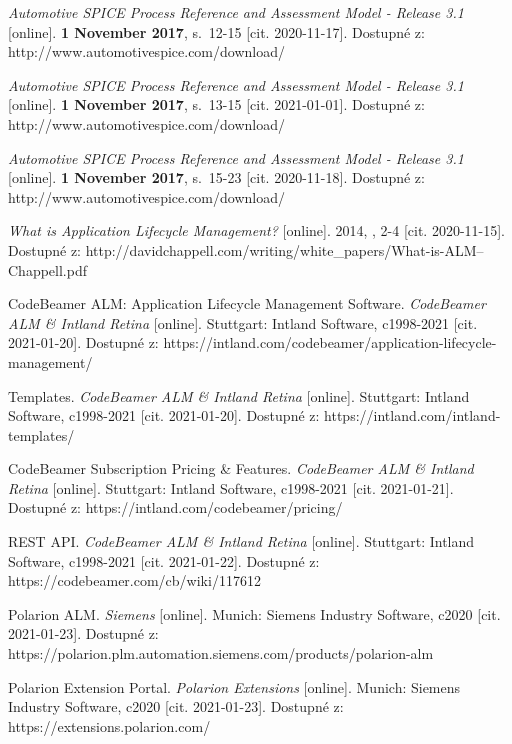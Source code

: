 \documentclass[czech,master,public,dept460,male,cpdeclaration,oneside]{diploma}
\begin{document}
\begin{thebibliography}{41}
\textit{Automotive SPICE Process Reference and Assessment Model - Release 3.1} [online]. \textbf{1 November 2017}, s.~12-15 [cit. 2020-11-17]. Dostupné z: http://www.automotivespice.com/download/


\textit{Automotive SPICE Process Reference and Assessment Model - Release 3.1} [online]. \textbf{1 November 2017}, s.~13-15 [cit. 2021-01-01]. Dostupné z: http://www.automotivespice.com/download/

\textit{Automotive SPICE Process Reference and Assessment Model - Release 3.1} [online]. \textbf{1 November 2017}, s.~15-23 [cit. 2020-11-18]. Dostupné z: http://www.automotivespice.com/download/

\textit{What is Application Lifecycle Management?} [online]. 2014, , 2-4 [cit. 2020-11-15]. Dostupné z: http://davidchappell.com/writing/white\_papers/What-is-ALM--Chappell.pdf

CodeBeamer ALM: Application Lifecycle Management Software. \textit{CodeBeamer ALM \& Intland Retina }[online]. Stuttgart: Intland Software, c1998-2021 [cit. 2021-01-20]. Dostupné z: https://intland.com/codebeamer/application-lifecycle-management/

Templates. \textit{CodeBeamer ALM \& Intland Retina} [online]. Stuttgart: Intland Software, c1998-2021 [cit. 2021-01-20]. Dostupné z: https://intland.com/intland-templates/

CodeBeamer Subscription Pricing \& Features. \textit{CodeBeamer ALM \& Intland Retina} [online]. Stuttgart: Intland Software, c1998-2021 [cit. 2021-01-21]. Dostupné z: https://intland.com/codebeamer/pricing/

REST API. \textit{CodeBeamer ALM \& Intland Retina} [online]. Stuttgart: Intland Software, c1998-2021 [cit. 2021-01-22]. Dostupné z: https://codebeamer.com/cb/wiki/117612

Polarion ALM. \textit{Siemens} [online]. Munich: Siemens Industry Software, c2020 [cit. 2021-01-23]. Dostupné z: https://polarion.plm.automation.siemens.com/products/polarion-alm

Polarion Extension Portal. \textit{Polarion Extensions} [online]. Munich: Siemens Industry Software, c2020 [cit. 2021-01-23]. Dostupné z: https://extensions.polarion.com/


\end{thebibliography}
\end{document}
